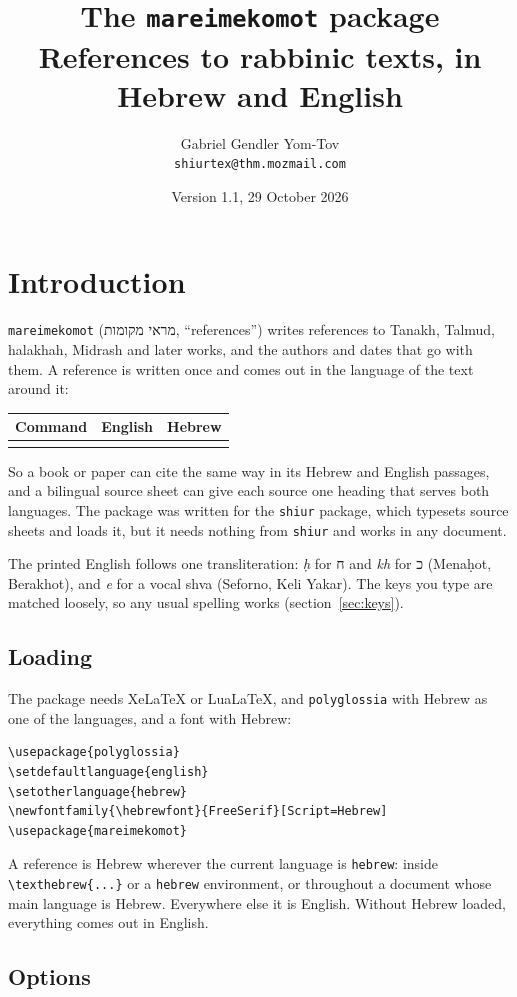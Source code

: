 \documentclass[11pt]{article}
\title{The \texttt{mareimekomot} package\\[0.3em]\large References to rabbinic texts, in Hebrew and English}
\author{Gabriel Gendler Yom-Tov\\\small\texttt{shiurtex@thm.mozmail.com}}
\date{Version 1.1, 29 October 2026}
\makeatletter
\newenvironment{examples}
	{\begin{center}\small\begin{tabular}{@{}lll@{}}\toprule Command & English & Hebrew \\ \midrule}
	{\bottomrule\end{tabular}\end{center}}
\makeatother
\begin{document}
\maketitle
\tableofcontents

\section{Introduction}

\texttt{mareimekomot} (\texthebrew{מראי מקומות}, ``references'') writes references to Tanakh,
Talmud, halakhah, Midrash and later works, and the authors and dates that go with them. A
reference is written once and comes out in the language of the text around it:
\begin{examples}
\row{\tanach{gen}{37:18-20}}
\row{\bavli{menachot}{69b}}
\row{\shulchanaruch{oh}{605:1}}
\row{\sefer{bereshitrabbah}{38:13}}
\end{examples}
So a book or paper can cite the same way in its Hebrew and English passages, and a bilingual
source sheet can give each source one heading that serves both languages. The package was
written for the \texttt{shiur} package, which typesets source sheets and loads it, but it needs
nothing from \texttt{shiur} and works in any document.

The printed English follows one transliteration: \textit{ḥ} for \texthebrew{ח} and
\textit{kh} for \texthebrew{כ} (Menaḥot, Berakhot), and \textit{e} for a vocal shva (Seforno,
Keli Yakar). The keys you type are matched loosely, so any usual spelling works
(section~\ref{sec:keys}).

\subsection{Loading}

The package needs XeLaTeX or LuaLaTeX, and \texttt{polyglossia} with Hebrew as one of the
languages, and a font with Hebrew:
\begin{Verbatim}
\usepackage{polyglossia}
\setdefaultlanguage{english}
\setotherlanguage{hebrew}
\newfontfamily{\hebrewfont}{FreeSerif}[Script=Hebrew]
\usepackage{mareimekomot}
\end{Verbatim}
A reference is Hebrew wherever the current language is \texttt{hebrew}: inside
\verb|\texthebrew{...}| or a \texttt{hebrew} environment, or throughout a document whose main
language is Hebrew. Everywhere else it is English. Without Hebrew loaded, everything comes out
in English.

\subsection{Options}
\end{document}
